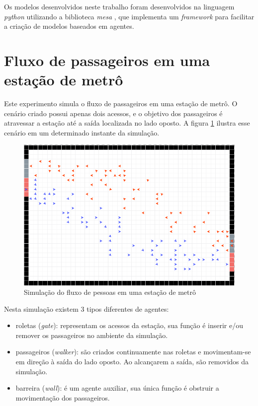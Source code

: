 \documentclass[preprint,12pt]{elsarticle}
\begin{document}
Os modelos desenvolvidos neste trabalho foram desenvolvidos na linguagem \textit{python} utilizando a biblioteca \textit{mesa} \cite{mesa2017agent}, que implementa um \textit{framework} para facilitar a criação de modelos baseados em agentes.

\section{Fluxo de passageiros em uma estação de metrô}
\label{sec:metro}

Este experimento simula o fluxo de passageiros em uma estação de metrô. O cenário criado possui apenas dois acessos, e o objetivo dos passageiros é atravessar a estação até a saída localizada no lado oposto. A figura \ref{fig:metro} ilustra esse cenário em um determinado instante da simulação.

\begin{figure}
	\centering
	\includegraphics[totalheight=5cm]{figures/metro.png}
	\caption{Simulação do fluxo de pessoas em uma estação de metrô}
	\label{fig:metro}
\end{figure}

Nesta simulação existem 3 tipos diferentes de agentes:

\begin{itemize}
	\setlength\itemsep{0pt}
	\item roletas (\textit{gate}): representam os acessos da estação, sua função é inserir e/ou remover os passageiros no ambiente da simulação.
	\item passageiros (\textit{walker}): são criados continuamente nas roletas e movimentam-se em direção à saída do lado oposto. Ao alcançarem a saída, são removidos da simulação.
	\item barreira (\textit{wall}): é um agente auxiliar, sua única função é obstruir a movimentação dos passageiros.
\end{itemize}
\end{document}
